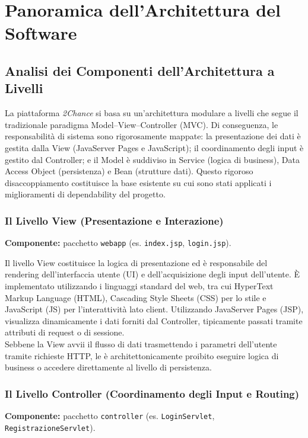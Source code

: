\chapter{Panoramica dell'Architettura del Software}

\section{Analisi dei Componenti dell'Architettura a Livelli}
La piattaforma \textit{2Chance} si basa su un'architettura modulare a livelli che segue il tradizionale paradigma Model--View--Controller (MVC). Di conseguenza, le responsabilità di sistema sono rigorosamente mappate: la presentazione dei dati è gestita dalla View (JavaServer Pages e JavaScript); il coordinamento degli input è gestito dal Controller; e il Model è suddiviso in Service (logica di business), Data Access Object (persistenza) e Bean (strutture dati). Questo rigoroso disaccoppiamento costituisce la base esistente su cui sono stati applicati i miglioramenti di dependability del progetto.

\subsection{Il Livello View (Presentazione e Interazione)}
\noindent\textbf{Componente:} pacchetto \texttt{webapp} (es. \texttt{index.jsp}, \texttt{login.jsp}).

\noindent Il livello View costituisce la logica di presentazione ed è responsabile del rendering dell'interfaccia utente (UI) e dell'acquisizione degli input dell'utente. È implementato utilizzando i linguaggi standard del web, tra cui HyperText Markup Language (HTML), Cascading Style Sheets (CSS) per lo stile e JavaScript (JS) per l'interattività lato client. Utilizzando JavaServer Pages (JSP), visualizza dinamicamente i dati forniti dal Controller, tipicamente passati tramite attributi di request o di sessione.\\

Sebbene la View avvii il flusso di dati trasmettendo i parametri dell'utente tramite richieste HTTP, le è architettonicamente proibito eseguire logica di business o accedere direttamente al livello di persistenza.

\subsection{Il Livello Controller (Coordinamento degli Input e Routing)}
\noindent\textbf{Componente:} pacchetto \texttt{controller} (es. \texttt{LoginServlet}, \texttt{RegistrazioneServlet}).

